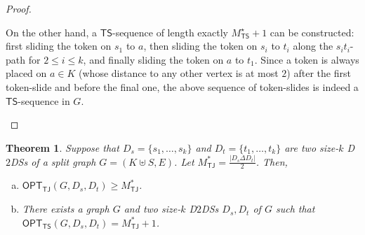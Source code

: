 \documentclass[a4paper]{article}
\theoremstyle{plain}
\newtheorem{theorem}{Theorem}
\theoremstyle{definition}
\newcommand{\sfTS}{{\mathsf{TS}}} %
\newcommand{\sfTJ}{{\mathsf{TJ}}} %
\newcommand{\opt}{\mathsf{OPT}} %
\begin{document}
\begin{proof}
\begin{enumerate}[(a)]
		On the other hand, a $\sfTS$-sequence of length exactly $M^\star_{\sfTS} + 1$ can be constructed: first sliding the token on $s_1$ to $a$, then sliding the token on $s_i$ to $t_i$ along the $s_it_i$-path for $2 \leq i \leq k$, and finally sliding the token on $a$ to $t_1$.
		Since a token is always placed on $a \in K$ (whose distance to any other vertex is at most $2$) after the first token-slide and before the final one, the above sequence of token-slides is indeed a $\sfTS$-sequence in $G$.
	\end{enumerate}
\end{proof}

\begin{theorem}\label{thm:TJ-split-shortest}
	Suppose that $D_s = \{s_1, \dots, s_k\}$ and $D_t = \{t_1, \dots, t_k\}$ are two size-$k$ D$2$DSs of a split graph $G = (K \uplus S, E)$.
	Let $\displaystyle M^{*}_{\sfTJ} = \frac{|D_s \Delta D_t|}{2}$. 
	Then,
	\begin{enumerate}[(a)]
		\item $\opt_{\sfTJ}(G, D_s, D_t) \geq M^*_{\sfTJ}$.
		\item There exists a graph $G$ and two size-$k$ D$2$DSs $D_s, D_t$ of $G$ such that $\displaystyle\opt_{\sfTS}(G, D_s, D_t) = M^*_{\sfTJ} + 1$.
	\end{enumerate}
\end{theorem}
\end{document}
